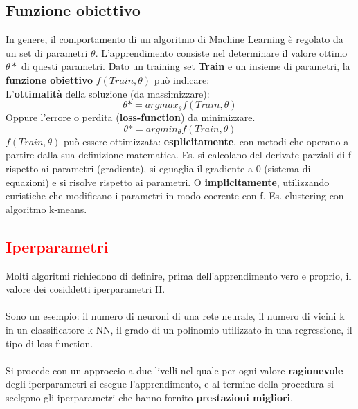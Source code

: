 \documentclass{article}
\begin{document}
\subsection{Funzione obiettivo}
In genere, il comportamento di un algoritmo di Machine Learning è regolato da un set di parametri $\theta$. L'apprendimento consiste nel determinare il valore ottimo $\theta *$ di questi parametri. Dato un training set \textbf{Train} e un insieme di parametri, la \textbf{funzione obiettivo} $f(Train, \theta)$ può indicare:\\
L'\textbf{ottimalità} della soluzione (da massimizzare): $$\theta* = argmax_\theta f(Train, \theta)$$
Oppure l'errore o perdita (\textbf{loss-function}) da minimizzare.
$$\theta*= argmin_\theta f(Train, \theta)$$
$f(Train, \theta)$ può essere ottimizzata: \textbf{esplicitamente}, con metodi che operano a partire dalla sua definizione matematica. Es. si calcolano del derivate parziali di f rispetto ai parametri (gradiente), si eguaglia il gradiente a 0 (sistema di equazioni) e si risolve rispetto ai parametri. O \textbf{implicitamente}, utilizzando euristiche che modificano i parametri in modo coerente con f. Es. clustering con algoritmo k-means.
\subsection{\textcolor{red}{Iperparametri}}
Molti algoritmi richiedono di definire, prima dell'apprendimento vero e proprio, il valore dei cosiddetti iperparametri H.\\\\
Sono un esempio: il numero di neuroni di una rete neurale, il numero di vicini k in un classificatore k-NN, il grado di un polinomio utilizzato in una regressione, il tipo di loss function.\\\\
Si procede con un approccio a due livelli nel quale per ogni valore \textbf{ragionevole} degli iperparametri si esegue l'apprendimento, e al termine della procedura si scelgono gli iperparametri che hanno fornito \textbf{prestazioni migliori}.
\end{document}
